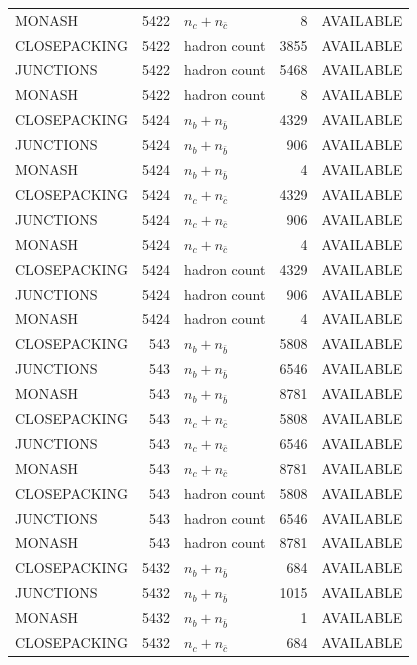 \begin{landscape}
\begin{longtable}{@{}lrlrl@{}}
MONASH & 5422 & $n_c+n_{\bar c}$ & \num{8} & AVAILABLE \\
CLOSEPACKING & 5422 & hadron count & \num{3855} & AVAILABLE \\
JUNCTIONS & 5422 & hadron count & \num{5468} & AVAILABLE \\
MONASH & 5422 & hadron count & \num{8} & AVAILABLE \\
CLOSEPACKING & 5424 & $n_b+n_{\bar b}$ & \num{4329} & AVAILABLE \\
JUNCTIONS & 5424 & $n_b+n_{\bar b}$ & \num{906} & AVAILABLE \\
MONASH & 5424 & $n_b+n_{\bar b}$ & \num{4} & AVAILABLE \\
CLOSEPACKING & 5424 & $n_c+n_{\bar c}$ & \num{4329} & AVAILABLE \\
JUNCTIONS & 5424 & $n_c+n_{\bar c}$ & \num{906} & AVAILABLE \\
MONASH & 5424 & $n_c+n_{\bar c}$ & \num{4} & AVAILABLE \\
CLOSEPACKING & 5424 & hadron count & \num{4329} & AVAILABLE \\
JUNCTIONS & 5424 & hadron count & \num{906} & AVAILABLE \\
MONASH & 5424 & hadron count & \num{4} & AVAILABLE \\
CLOSEPACKING & 543 & $n_b+n_{\bar b}$ & \num{5808} & AVAILABLE \\
JUNCTIONS & 543 & $n_b+n_{\bar b}$ & \num{6546} & AVAILABLE \\
MONASH & 543 & $n_b+n_{\bar b}$ & \num{8781} & AVAILABLE \\
CLOSEPACKING & 543 & $n_c+n_{\bar c}$ & \num{5808} & AVAILABLE \\
JUNCTIONS & 543 & $n_c+n_{\bar c}$ & \num{6546} & AVAILABLE \\
MONASH & 543 & $n_c+n_{\bar c}$ & \num{8781} & AVAILABLE \\
CLOSEPACKING & 543 & hadron count & \num{5808} & AVAILABLE \\
JUNCTIONS & 543 & hadron count & \num{6546} & AVAILABLE \\
MONASH & 543 & hadron count & \num{8781} & AVAILABLE \\
CLOSEPACKING & 5432 & $n_b+n_{\bar b}$ & \num{684} & AVAILABLE \\
JUNCTIONS & 5432 & $n_b+n_{\bar b}$ & \num{1015} & AVAILABLE \\
MONASH & 5432 & $n_b+n_{\bar b}$ & \num{1} & AVAILABLE \\
CLOSEPACKING & 5432 & $n_c+n_{\bar c}$ & \num{684} & AVAILABLE \\

\end{longtable}
\end{landscape}
